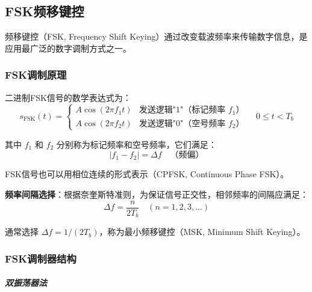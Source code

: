 \subsection{FSK频移键控}

频移键控（FSK, Frequency Shift Keying）通过改变载波频率来传输数字信息，是应用最广泛的数字调制方式之一。

\subsubsection{FSK调制原理}

二进制FSK信号的数学表达式为：
\begin{equation}
    s_{\text{FSK}}(t) =
    \begin{cases}
        A\cos(2\pi f_1 t) & \text{发送逻辑"1"（标记频率 } f_1 \text{）} \\
        A\cos(2\pi f_2 t) & \text{发送逻辑"0"（空号频率 } f_2 \text{）}
    \end{cases}
    \quad 0 \leq t < T_b
\end{equation}

其中 $f_1$ 和 $f_2$ 分别称为标记频率和空号频率，它们满足：
\begin{equation}
    |f_1 - f_2| = \Delta f \quad \text{（频偏）}
\end{equation}

FSK信号也可以用相位连续的形式表示（CPFSK, Continuous Phase FSK）。

\textbf{频率间隔选择}：根据奈奎斯特准则，为保证信号正交性，相邻频率的间隔应满足：
\begin{equation}
    \Delta f = \frac{n}{2T_b} \quad (n = 1, 2, 3, \ldots)
\end{equation}

通常选择 $\Delta f = 1/(2T_b)$，称为最小频移键控（MSK, Minimum Shift Keying）。

\subsubsection{FSK调制器结构}

\subparagraph{双振荡器法}

